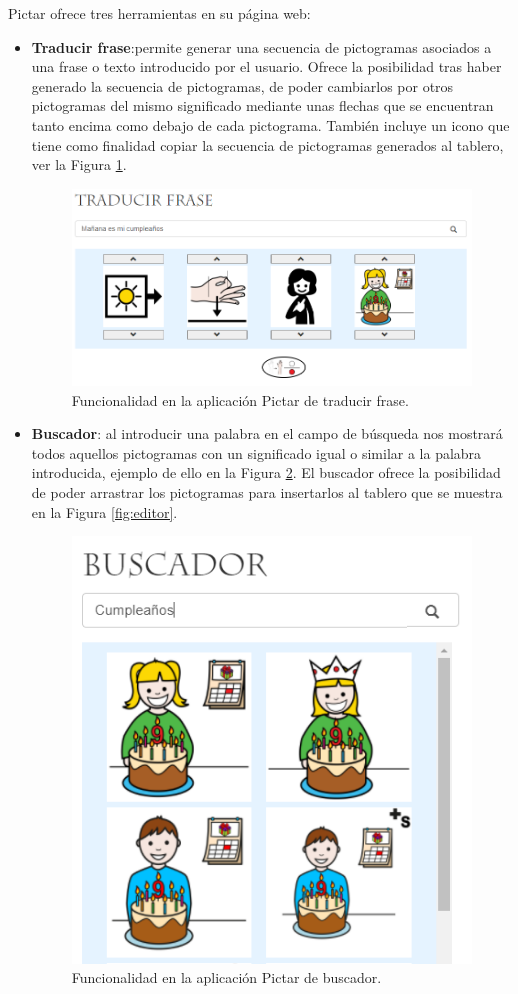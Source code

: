Pictar ofrece tres herramientas en su página web:
\begin{itemize}
	\item \textbf{Traducir frase}:permite generar una secuencia de pictogramas asociados a una frase o texto introducido por el usuario. Ofrece la posibilidad tras haber generado la secuencia de pictogramas, de poder cambiarlos por otros pictogramas del mismo significado mediante unas flechas que se encuentran tanto encima como debajo de cada pictograma. También incluye un icono que tiene como finalidad copiar la secuencia de pictogramas generados al tablero, ver la Figura \ref{fig:traducirfrase}.
	
	\begin{figure}[h!]
		\centering
		\includegraphics[width=0.7\linewidth]{Imagenes/Bitmap/TraducirFrase}
		\caption{Funcionalidad en la aplicación Pictar de traducir frase.}
		\label{fig:traducirfrase}
	\end{figure}

	\item \textbf{Buscador}: al introducir una palabra en el campo de búsqueda nos mostrará todos aquellos pictogramas con un significado igual o similar a la palabra introducida, ejemplo de ello en la Figura \ref{fig:buscador}. El buscador ofrece la posibilidad de poder arrastrar los pictogramas para insertarlos al tablero que se muestra en la Figura \ref{fig:editor}.
	
	\begin{figure}[h!]
		\centering
		\includegraphics[width=0.5\linewidth]{Imagenes/Bitmap/buscador}
		\caption{Funcionalidad en la aplicación Pictar de buscador.}
		\label{fig:buscador}
	\end{figure}
	

\end{itemize}
